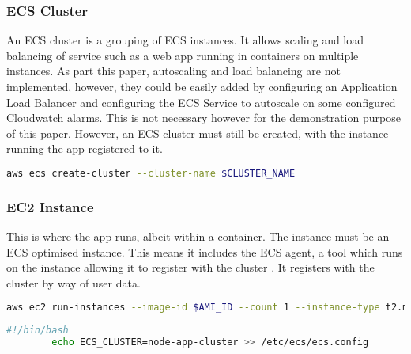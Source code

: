 		\subsubsection{ECS Cluster}
		 An ECS cluster is a grouping of ECS instances. It allows scaling and load balancing of service such as a web app running in containers on multiple instances. As part this paper, autoscaling and load balancing are not implemented, however, they could be easily added by configuring an Application Load Balancer and configuring the ECS Service to autoscale on some configured Cloudwatch alarms. This is not necessary however for the demonstration purpose of this paper. However, an ECS cluster must still be created, with the instance running the app registered to it.
			
		\begin{minipage}{\textwidth}
		\begin{lstlisting}[caption={Create ECS Cluster},language=bash]
		aws ecs create-cluster --cluster-name $CLUSTER_NAME
		\end{lstlisting}
		\end{minipage}
		
		\subsubsection{EC2 Instance}
		This is where the app runs, albeit within a container. The instance must be an ECS optimised instance. This means it includes the ECS agent, a tool which runs on the instance allowing it to register with the cluster \citep{aws-instance}. It registers with the cluster by way of user data.
		
		\begin{minipage}{\textwidth}
		\begin{lstlisting}[caption={Create EC2 Instance},label={create-instance},language=bash]
		aws ec2 run-instances --image-id $AMI_ID --count 1 --instance-type t2.micro --key-name $KEY_NAME --security-groups $HTTPSSH_SEC_GROUP $HTTP_GITHUB --iam-instance-profile Name=$ECS_INSTANCE_ROLE --user-data file://user-data --tag-specifications 'ResourceType=instance,Tags=[{Key=Name,Value='$INSTANCE_NAME'}]'
		\end{lstlisting}
		\end{minipage}
		
		\begin{minipage}{\textwidth}
		\begin{lstlisting}[caption={User Data},language=bash]
		#!/bin/bash	
		echo ECS_CLUSTER=node-app-cluster >> /etc/ecs/ecs.config	
		\end{lstlisting}
		\end{minipage}
		
